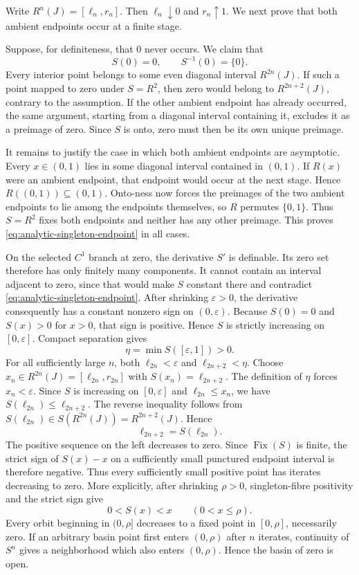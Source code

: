 \documentclass[11pt]{article}
\theoremstyle{definition}
\theoremstyle{remark}
\newcommand{\Fix}{\operatorname{Fix}}
\begin{document}
Write \(R^n(J)=[\ell_n,r_n]\).  Then
\(\ell_n\downarrow0\) and \(r_n\uparrow1\).  We next prove that both ambient
endpoints occur at a finite stage.

Suppose, for definiteness, that \(0\) never occurs.  We claim that
\begin{equation}\label{eq:analytic-singleton-endpoint}
 S(0)=0,\qquad S^{-1}(0)=\{0\}.
\end{equation}
Every interior point belongs to some even diagonal interval
\(R^{2n}(J)\).  If such a point mapped to zero under \(S=R^2\), then zero
would belong to \(R^{2n+2}(J)\), contrary to the assumption.  If the other
ambient endpoint has already occurred, the same argument, starting from a
diagonal interval containing it, excludes it as a preimage of zero.  Since
\(S\) is onto, zero must then be its own unique preimage.

It remains to justify the case in which both ambient endpoints are
asymptotic.  Every \(x\in(0,1)\) lies in some diagonal interval contained in
\((0,1)\).  If \(R(x)\) were an ambient endpoint, that endpoint would occur
at the next stage.  Hence \(R((0,1))\subseteq(0,1)\).  Onto-ness now forces
the preimages of the two ambient endpoints to lie among the endpoints
themselves, so \(R\) permutes \(\{0,1\}\).  Thus \(S=R^2\) fixes both
endpoints and neither has any other preimage.  This proves
\eqref{eq:analytic-singleton-endpoint} in all cases.

On the selected \(C^1\) branch at zero, the derivative \(S'\) is definable.
Its zero set therefore has only finitely many components.  It cannot contain
an interval adjacent to zero, since that would make \(S\) constant there and
contradict \eqref{eq:analytic-singleton-endpoint}.  After shrinking
\(\varepsilon>0\), the derivative consequently has a constant nonzero sign
on \((0,\varepsilon)\).  Because \(S(0)=0\) and \(S(x)>0\) for \(x>0\), that
sign is positive.  Hence \(S\) is strictly increasing on
\([0,\varepsilon]\).
Compact separation gives
\[
 \eta=\min S([\varepsilon,1])>0.
\]
For all sufficiently large \(n\), both
\(\ell_{2n}<\varepsilon\) and \(\ell_{2n+2}<\eta\).  Choose
\(x_n\in R^{2n}(J)=[\ell_{2n},r_{2n}]\) with
\(S(x_n)=\ell_{2n+2}\).  The definition of \(\eta\) forces
\(x_n<\varepsilon\).  Since \(S\) is increasing on
\([0,\varepsilon]\) and \(\ell_{2n}\leq x_n\), we have
\(S(\ell_{2n})\leq\ell_{2n+2}\).  The reverse inequality follows from
\(S(\ell_{2n})\in S(R^{2n}(J))=R^{2n+2}(J)\).  Hence
\[
 \ell_{2n+2}=S(\ell_{2n}).
\]
The positive sequence on the left decreases to zero.  Since \(\Fix(S)\) is
finite, the strict sign of \(S(x)-x\) on a sufficiently small punctured
endpoint interval is therefore negative.  Thus every sufficiently small
positive point has iterates decreasing to zero.  More explicitly, after
shrinking \(\rho>0\), singleton-fibre positivity and the strict sign give
\[
 0<S(x)<x\qquad(0<x\leq\rho).
\]
Every orbit beginning in \((0,\rho]\) decreases to a fixed point in
\([0,\rho]\), necessarily zero.  If an arbitrary basin point first enters
\((0,\rho)\) after \(n\) iterates, continuity of \(S^n\) gives a neighborhood
which also enters \((0,\rho)\).  Hence the basin of zero is open.
\end{document}
